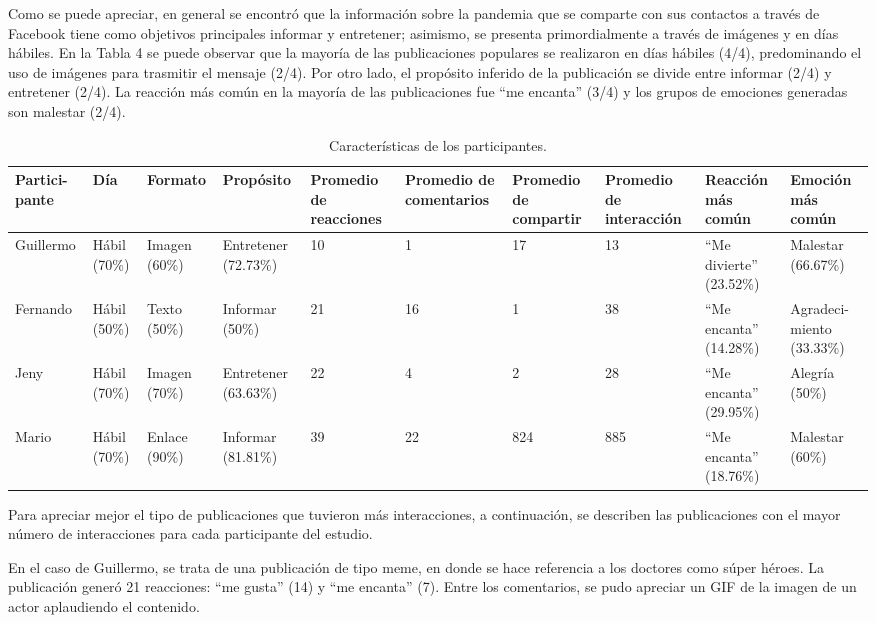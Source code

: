 \documentclass[spanish]{textolivre}
\begin{document}
Como se puede apreciar, en general se encontró que la información sobre la pandemia que se comparte con sus contactos a través de Facebook tiene como objetivos principales informar y entretener; asimismo, se presenta primordialmente a través de imágenes y en días hábiles. En la Tabla 4 se puede observar que la mayoría de las publicaciones populares se realizaron en días hábiles (4/4), predominando el uso de imágenes para trasmitir el mensaje (2/4). Por otro lado, el propósito inferido de la publicación se divide entre informar (2/4) y entretener (2/4). La reacción más común en la mayoría de las publicaciones fue “me encanta” (3/4) y los grupos de emociones generadas son malestar (2/4). 

%
%
\begin{table}[htpb]
\caption{Características de los participantes.}
\label{tab04}
\small
\centering
\begin{tabularx}{\textwidth}{XXXXXXXXXX}
\toprule 
Partici-pante & Día & Formato & Propósito & Promedio de reacciones &
Promedio de comentarios & Promedio de compartir & Promedio de interacción &
Reacción más común & Emoción más común \\
\midrule
Guillermo & Hábil (70\%) & Imagen (60\%) & Entretener (72.73\%) & 10 & 1 & 17 & 13 & “Me divierte” (23.52\%) & Malestar (66.67\%) \\
Fernando & Hábil (50\%) & Texto (50\%) & Informar (50\%) & 21 & 16 & 1 & 38 & “Me encanta” (14.28\%) & Agradeci-miento (33.33\%) \\
Jeny & Hábil (70\%) & Imagen (70\%) & Entretener (63.63\%) & 22 & 4 & 2 & 28 & “Me encanta” (29.95\%) & Alegría (50\%) \\
Mario & Hábil (70\%) & Enlace (90\%) & Informar (81.81\%) & 39 & 22 & 824 & 885 & “Me encanta” (18.76\%) & Malestar (60\%) \\
\bottomrule
\end{tabularx}
\end{table}

Para apreciar mejor el tipo de publicaciones que tuvieron más interacciones, a continuación, se describen las publicaciones con el mayor número de interacciones para cada participante del estudio. 

En el caso de Guillermo, se trata de una publicación de tipo meme, en donde se hace referencia a los doctores como súper héroes. La publicación generó 21 reacciones: “me gusta” (14) y “me encanta” (7). Entre los comentarios, se pudo apreciar un GIF de la imagen de un actor aplaudiendo el contenido. 
\end{document}
